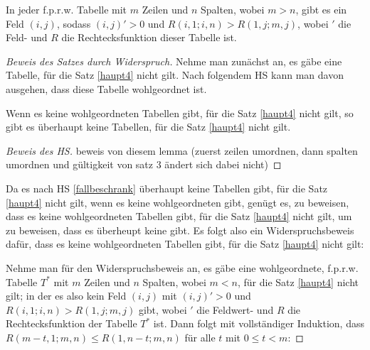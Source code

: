 \begin{thm}\label{haupt4}
    In jeder f.p.r.w. Tabelle mit $m$ Zeilen und $n$ Spalten, wobei $m>n$, gibt es ein Feld $(i, j)$, sodass 
    $(i, j)'>0$ und $R(i, 1; i, n) > R(1, j; m, j)$, wobei $'$ die Feld- und $R$ die Rechtecksfunktion dieser 
    Tabelle ist.
\end{thm}

\begin{proof}[Beweis des Satzes durch Widerspruch]
    Nehme man zunächst an, es gäbe eine Tabelle, für die Satz \ref{haupt4} nicht gilt. Nach folgendem HS kann man 
    davon ausgehen, dass diese Tabelle wohlgeordnet ist.
    \begin{lem}\label{fallbeschrank}
        Wenn es keine wohlgeordneten Tabellen gibt, für die Satz \ref{haupt4} nicht gilt, so gibt es überhaupt keine 
        Tabellen, für die Satz \ref{haupt4} nicht gilt.
    \end{lem}
    \begin{proof}[Beweis des HS]
        beweis von diesem lemma (zuerst zeilen umordnen, dann spalten umordnen und gültigkeit von satz 3 ändert sich 
        dabei nicht) %
    \end{proof}
    Da es nach HS \ref{fallbeschrank} überhaupt keine Tabellen gibt, für die Satz \ref{haupt4} 
    nicht gilt, wenn es keine wohlgeordneten gibt, genügt es, zu beweisen, dass es keine wohlgeordneten Tabellen 
    gibt, für die Satz \ref{haupt4} nicht gilt, um zu beweisen, dass es überheupt keine gibt. Es folgt also ein 
    Widerspruchsbeweis dafür, dass es keine wohlgeordneten Tabellen gibt, für die Satz \ref{haupt4} nicht gilt:

    Nehme man für den Widerspruchsbeweis an, es gäbe eine wohlgeordnete, f.p.r.w. Tabelle $T^*$ mit $m$ Zeilen und $n$ 
    Spalten, wobei $m<n$, für die Satz \ref{haupt4} nicht gilt; in der es also kein Feld $(i, j)$ mit $(i, j)'>0$ 
    und $R(i, 1; i, n)>R(1, j; m, j)$ gibt, wobei $'$ die Feldwert- und $R$ die Rechtecksfunktion der Tabelle $T^*$ 
    ist. Dann folgt mit vollständiger Induktion, dass $R(m-t, 1; m, n)\leq R(1, n-t; m, n)$ für alle $t$ mit $0\leq 
    t<m$:


\end{proof}
